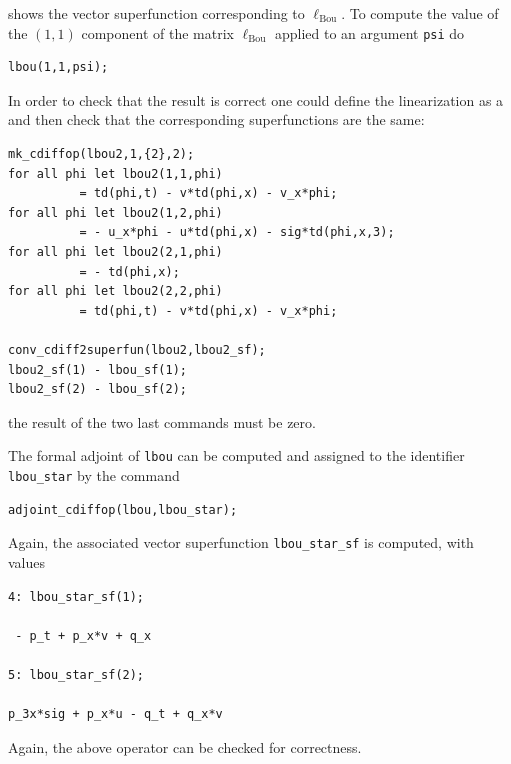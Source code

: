 shows the vector superfunction corresponding to $\ell_{\text{Bou}}$. To compute
the value of the $(1,1)$ component of the matrix $\ell_{\text{Bou}}$ applied to
an argument \texttt{psi} do
\begin{verbatim}
lbou(1,1,psi);
\end{verbatim}
In order to check that the result is correct one could define the linearization
as a \cdiffop and then check that the corresponding superfunctions are the
same:
\begin{verbatim}
mk_cdiffop(lbou2,1,{2},2);
for all phi let lbou2(1,1,phi)
          = td(phi,t) - v*td(phi,x) - v_x*phi;
for all phi let lbou2(1,2,phi)
          = - u_x*phi - u*td(phi,x) - sig*td(phi,x,3);
for all phi let lbou2(2,1,phi)
          = - td(phi,x);
for all phi let lbou2(2,2,phi)
          = td(phi,t) - v*td(phi,x) - v_x*phi;

conv_cdiff2superfun(lbou2,lbou2_sf);
lbou2_sf(1) - lbou_sf(1);
lbou2_sf(2) - lbou_sf(2);
\end{verbatim}
the result of the two last commands must be zero.

The formal adjoint of \texttt{lbou} can be computed and assigned to the
identifier \texttt{lbou\_star} by the command
\hypertarget{operator:ADJOINT_CDIFFOP}{}
\begin{verbatim}
adjoint_cdiffop(lbou,lbou_star);
\end{verbatim}
Again, the associated vector superfunction \texttt{lbou\_star\_sf} is computed,
with values
\begin{verbatim}
4: lbou_star_sf(1);

 - p_t + p_x*v + q_x

5: lbou_star_sf(2);

p_3x*sig + p_x*u - q_t + q_x*v
\end{verbatim}
Again, the above operator can be checked for correctness.

